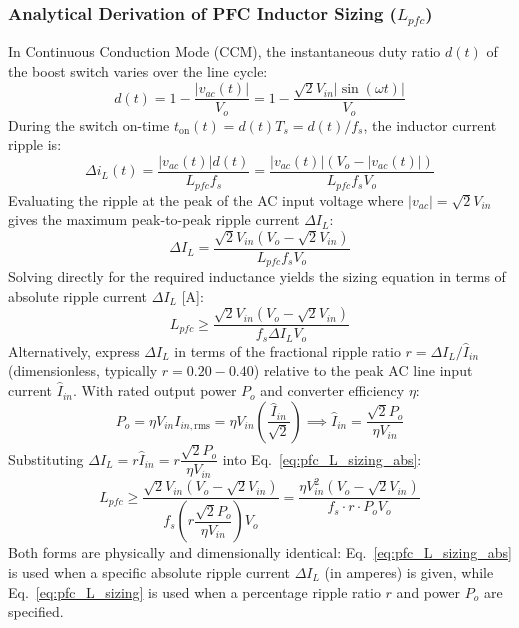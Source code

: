 \subsubsection{Analytical Derivation of PFC Inductor Sizing ($L_{pfc}$)}
In Continuous Conduction Mode (CCM), the instantaneous duty ratio $d(t)$ of the boost switch varies over the line cycle:
\begin{equation}
d(t) = 1 - \frac{|v_{ac}(t)|}{V_o} = 1 - \frac{\sqrt{2} V_{in}|\sin(\omega t)|}{V_o}
\end{equation}
During the switch on-time $t_{\mathrm{on}}(t) = d(t) T_s = d(t)/f_s$, the inductor current ripple is:
\begin{equation}
\Delta i_L(t) = \frac{|v_{ac}(t)| d(t)}{L_{pfc} f_s} = \frac{|v_{ac}(t)|\left(V_o - |v_{ac}(t)|\right)}{L_{pfc} f_s V_o}
\end{equation}
Evaluating the ripple at the peak of the AC input voltage where $|v_{ac}| = \sqrt{2} V_{in}$ gives the maximum peak-to-peak ripple current $\Delta I_L$:
\begin{equation}
\Delta I_L = \frac{\sqrt{2} V_{in}\left(V_o - \sqrt{2} V_{in}\right)}{L_{pfc} f_s V_o}
\end{equation}
Solving directly for the required inductance yields the sizing equation in terms of absolute ripple current $\Delta I_L$ [A]:
\begin{equation}
\label{eq:pfc_L_sizing_abs}
L_{pfc} \ge \frac{\sqrt{2} V_{in}\left(V_o - \sqrt{2} V_{in}\right)}{f_s \Delta I_L V_o}
\end{equation}
Alternatively, express $\Delta I_L$ in terms of the fractional ripple ratio $r = \Delta I_L / \hat{I}_{in}$ (dimensionless, typically $r = 0.20 - 0.40$) relative to the peak AC line input current $\hat{I}_{in}$. With rated output power $P_o$ and converter efficiency $\eta$:
\begin{equation}
P_o = \eta V_{in} I_{in,\mathrm{rms}} = \eta V_{in} \left(\frac{\hat{I}_{in}}{\sqrt{2}}\right) \implies \hat{I}_{in} = \frac{\sqrt{2} P_o}{\eta V_{in}}
\end{equation}
Substituting $\Delta I_L = r \hat{I}_{in} = r \dfrac{\sqrt{2} P_o}{\eta V_{in}}$ into Eq.~\eqref{eq:pfc_L_sizing_abs}:
\begin{equation}
\label{eq:pfc_L_sizing}
L_{pfc} \ge \frac{\sqrt{2} V_{in}\left(V_o - \sqrt{2} V_{in}\right)}{f_s \left(r \dfrac{\sqrt{2} P_o}{\eta V_{in}}\right) V_o} = \frac{\eta V_{in}^2 \left(V_o - \sqrt{2} V_{in}\right)}{f_s \cdot r \cdot P_o V_o}
\end{equation}
Both forms are physically and dimensionally identical: Eq.~\eqref{eq:pfc_L_sizing_abs} is used when a specific absolute ripple current $\Delta I_L$ (in amperes) is given, while Eq.~\eqref{eq:pfc_L_sizing} is used when a percentage ripple ratio $r$ and power $P_o$ are specified.

